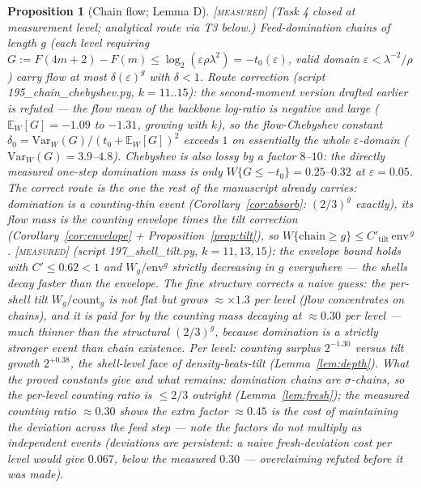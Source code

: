 \documentclass[11pt]{article}
\newtheorem{proposition}[theorem]{Proposition}
\theoremstyle{definition}
\newcommand{\MEASURED}{\textup{[\textsc{measured}]}}
\newcommand{\E}{\mathbb{E}}
\newcommand{\Var}{\mathrm{Var}}
\newcommand{\lam}{\lambda}
\begin{document}
\begin{proposition}[Chain flow; Lemma D]\label{prop:chain} \MEASURED{}
\emph{(Task 4 closed at measurement level; analytical route via T3 below.)}
Feed-domination chains of length $g$ (each level requiring
$G := F(4m{+}2) - F(m) \le \log_2(\varepsilon\rho\lam^2) = -t_0(\varepsilon)$,
valid domain $\varepsilon < \lam^{-2}/\rho$) carry flow at most
$\delta(\varepsilon)^g$ with $\delta < 1$.
\emph{Route correction (script 195\_chain\_chebyshev.py, $k=11..15$):}
the second-moment version drafted earlier is \emph{refuted} --- the flow
mean of the backbone log-ratio is negative and large
($\E_W[G] = -1.09$ to $-1.31$, growing with $k$), so the flow-Chebyshev
constant $\delta_0 = \Var_W(G)/(t_0 + \E_W[G])^2$ exceeds $1$ on
essentially the whole $\varepsilon$-domain ($\Var_W(G) = 3.9$--$4.8$).
Chebyshev is also \emph{lossy by a factor $8$--$10$}: the directly
measured one-step domination mass is only $W\{G \le -t_0\} = 0.25$--$0.32$
at $\varepsilon = 0.05$. The correct route is the one the rest of the
manuscript already carries: domination is a counting-thin event
(Corollary~\ref{cor:absorb}: $(2/3)^g$ exactly), its flow mass is the
counting envelope times the tilt correction
(Corollary~\ref{cor:envelope} + Proposition~\ref{prop:tilt}), so
$W\{\text{chain} \ge g\} \le C'_{\mathrm{tilt}}\,\mathrm{env}^{\,g}$.
\MEASURED{} (script 197\_shell\_tilt.py, $k = 11, 13, 15$): the
envelope bound holds with $C' \le 0.62 < 1$ and $W_g/\mathrm{env}^g$
\emph{strictly decreasing} in $g$ everywhere --- the shells decay
faster than the envelope. The fine structure corrects a naive guess:
the per-shell tilt $W_g/\mathrm{count}_g$ is \emph{not} flat but grows
$\approx \times 1.3$ per level (flow concentrates on chains), and it is
paid for by the counting mass decaying at $\approx 0.30$ per level ---
much thinner than the structural $(2/3)^g$, because domination is a
strictly stronger event than chain existence. Per level:
counting surplus $2^{-1.30}$ versus tilt growth $2^{+0.38}$, the
shell-level face of density-beats-tilt (Lemma~\ref{lem:depth}).
\emph{What the proved constants give and what remains:} domination
chains are $\sigma$-chains, so the per-level \emph{counting} ratio is
$\le 2/3$ outright (Lemma~\ref{lem:fresh}); the measured counting ratio
$\approx 0.30$ shows the extra factor $\approx 0.45$ is the cost of
\emph{maintaining} the deviation across the feed step --- note the
factors do \emph{not} multiply as independent events (deviations are
persistent: a naive fresh-deviation cost per level would give $0.067$,
below the measured $0.30$ --- overclaiming refuted before it was made).

\end{proposition}
\end{document}
